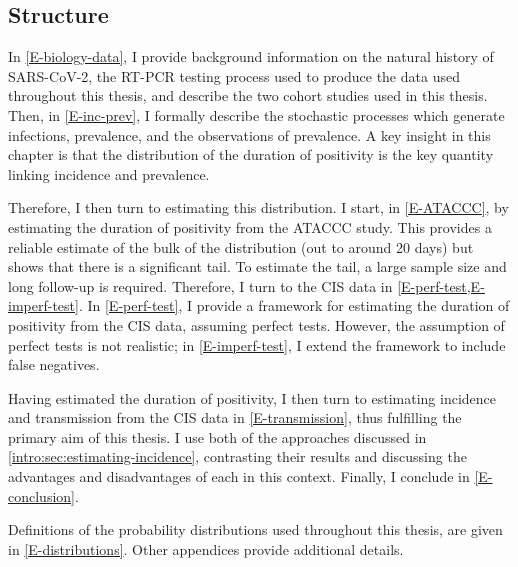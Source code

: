 \documentclass[thesis.tex]{subfiles}
\begin{document}
\subsection{Structure}

In \cref{E-biology-data}, I provide background information on the natural history of SARS-CoV-2, the RT-PCR testing process used to produce the data used throughout this thesis, and describe the two cohort studies used in this thesis.
Then, in \cref{E-inc-prev}, I formally describe the stochastic processes which generate infections, prevalence, and the observations of prevalence.
A key insight in this chapter is that the distribution of the duration of positivity is the key quantity linking incidence and prevalence.

Therefore, I then turn to estimating this distribution.
I start, in \cref{E-ATACCC}, by estimating the duration of positivity from the ATACCC study.
This provides a reliable estimate of the bulk of the distribution (out to around 20 days) but shows that there is a significant tail.
To estimate the tail, a large sample size and long follow-up is required.
Therefore, I turn to the CIS data in \cref{E-perf-test,E-imperf-test}.
In \cref{E-perf-test}, I provide a framework for estimating the duration of positivity from the CIS data, assuming perfect tests.
However, the assumption of perfect tests is not realistic; in \cref{E-imperf-test}, I extend the framework to include false negatives.

Having estimated the duration of positivity, I then turn to estimating incidence and transmission from the CIS data in \cref{E-transmission}, thus fulfilling the primary aim of this thesis.
I use both of the approaches discussed in \cref{intro:sec:estimating-incidence}, contrasting their results and discussing the advantages and disadvantages of each in this context.
Finally, I conclude in \cref{E-conclusion}.

Definitions of the probability distributions used throughout this thesis, are given in \cref{E-distributions}.
Other appendices provide additional details.

\ifSubfilesClassLoaded{
  \appendix
%   
  \listoftodos
}{}
\end{document}
